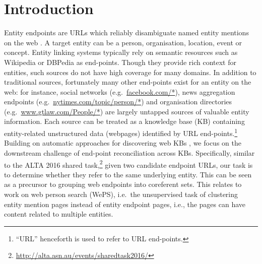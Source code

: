 \documentclass[letterpaper]{sig-alternate-2013}
\begin{document}

\section{Introduction}


Entity endpoints are URLs which reliably disambiguate named entity mentions on the web \cite{chisholm2016akbc}. A target entity can be a person, organisation, location, event or concept. Entity linking systems typically rely on semantic resources such as Wikipedia or DBPedia as end-points. Though they provide rich context for entities, such sources do not have high coverage for many domains. In addition to traditional sources, fortunately many other end-points exist for an entity on the web: for instance,  social networks (e.g.\ \url{facebook.com/*}), news aggregation endpoints (e.g.\ \url{nytimes.com/topic/person/*}) and organisation directories (e.g.\ \url{www.gtlaw.com/People/*}) are largely untapped  sources of valuable entity information. Each source can be treated as a knowledge base (KB) containing entity-related unstructured data (webpages) identified by URL end-points.\footnote{``URL'' henceforth is used to refer to URL end-points.} Building on automatic approaches for discovering web KBs \cite{chisholm2016akbc}, we focus on the downstream challenge of end-point reconciliation across KBs. Specifically, similar to the ALTA 2016 shared task,\footnote{\url{http://alta.asn.au/events/sharedtask2016/}} given two candidate endpoint URLs, our task is to determine whether they refer to the same underlying entity. This can be seen as a precursor to grouping web endpoints into coreferent sets. This relates to work on web person search (WePS), i.e.\ the unsupervised task of clustering entity mention pages instead of entity endpoint pages, i.e., the pages can have content related to multiple entities.
\end{document}
